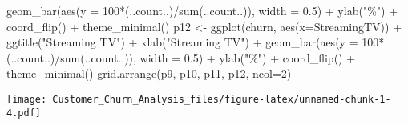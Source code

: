 \documentclass[
]{article}
\newenvironment{Shaded}{\begin{snugshade}}{\end{snugshade}}
\newcommand{\AttributeTok}[1]{\textcolor[rgb]{0.77,0.63,0.00}{#1}}
\newcommand{\DecValTok}[1]{\textcolor[rgb]{0.00,0.00,0.81}{#1}}
\newcommand{\FloatTok}[1]{\textcolor[rgb]{0.00,0.00,0.81}{#1}}
\newcommand{\FunctionTok}[1]{\textcolor[rgb]{0.00,0.00,0.00}{#1}}
\newcommand{\NormalTok}[1]{#1}
\newcommand{\OtherTok}[1]{\textcolor[rgb]{0.56,0.35,0.01}{#1}}
\newcommand{\SpecialCharTok}[1]{\textcolor[rgb]{0.00,0.00,0.00}{#1}}
\newcommand{\StringTok}[1]{\textcolor[rgb]{0.31,0.60,0.02}{#1}}
\begin{document}
\begin{Shaded}
\begin{Highlighting}[]
  \FunctionTok{geom\_bar}\NormalTok{(}\FunctionTok{aes}\NormalTok{(}\AttributeTok{y =} \DecValTok{100}\SpecialCharTok{*}\NormalTok{(..count..)}\SpecialCharTok{/}\FunctionTok{sum}\NormalTok{(..count..)), }\AttributeTok{width =} \FloatTok{0.5}\NormalTok{) }\SpecialCharTok{+} \FunctionTok{ylab}\NormalTok{(}\StringTok{"\%"}\NormalTok{) }\SpecialCharTok{+} \FunctionTok{coord\_flip}\NormalTok{() }\SpecialCharTok{+} \FunctionTok{theme\_minimal}\NormalTok{()}
\NormalTok{p12 }\OtherTok{\textless{}{-}} \FunctionTok{ggplot}\NormalTok{(churn, }\FunctionTok{aes}\NormalTok{(}\AttributeTok{x=}\NormalTok{StreamingTV)) }\SpecialCharTok{+} \FunctionTok{ggtitle}\NormalTok{(}\StringTok{"Streaming TV"}\NormalTok{) }\SpecialCharTok{+} \FunctionTok{xlab}\NormalTok{(}\StringTok{"Streaming TV"}\NormalTok{) }\SpecialCharTok{+}
  \FunctionTok{geom\_bar}\NormalTok{(}\FunctionTok{aes}\NormalTok{(}\AttributeTok{y =} \DecValTok{100}\SpecialCharTok{*}\NormalTok{(..count..)}\SpecialCharTok{/}\FunctionTok{sum}\NormalTok{(..count..)), }\AttributeTok{width =} \FloatTok{0.5}\NormalTok{) }\SpecialCharTok{+} \FunctionTok{ylab}\NormalTok{(}\StringTok{"\%"}\NormalTok{) }\SpecialCharTok{+} \FunctionTok{coord\_flip}\NormalTok{() }\SpecialCharTok{+} \FunctionTok{theme\_minimal}\NormalTok{()}
\FunctionTok{grid.arrange}\NormalTok{(p9, p10, p11, p12, }\AttributeTok{ncol=}\DecValTok{2}\NormalTok{)}
\end{Highlighting}
\end{Shaded}

\texttt{[image: Customer\_Churn\_Analysis\_files/figure-latex/unnamed-chunk-1-4.pdf]}
\end{document}
